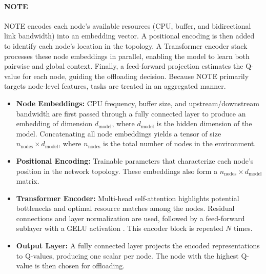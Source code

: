 \documentclass[preprint,12pt]{elsarticle}
\begin{document}
\paragraph{NOTE}
\label{par:nOTE}

NOTE encodes each node’s available resources (CPU, buffer, and bidirectional link bandwidth) into an embedding vector. A positional encoding is then added to identify each node’s location in the topology. A Transformer encoder stack processes these node embeddings in parallel, enabling the model to learn both pairwise and global context. Finally, a feed-forward projection estimates the Q-value for each node, guiding the offloading decision. Because NOTE primarily targets node-level features, tasks are treated in an aggregated manner.

\begin{itemize}
    \item \textbf{Node Embeddings:} CPU frequency, buffer size, and upstream/downstream bandwidth are first passed through a fully connected layer to produce an embedding of dimension \(\displaystyle d_{\text{model}}\), where \(d_{\text{model}}\) is the hidden dimension of the model. Concatenating all node embeddings yields a tensor of size \(\displaystyle n_{\text{nodes}} \times d_{\text{model}}\), where \(n_{\text{nodes}}\) is the total number of nodes in the environment.
    \item \textbf{Positional Encoding:} Trainable parameters that characterize each node’s position in the network topology. These embeddings also form a \(\displaystyle n_{\text{nodes}} \times d_{\text{model}}\) matrix.
    \item \textbf{Transformer Encoder:} Multi-head self-attention highlights potential bottlenecks and optimal resource matches among the nodes. Residual connections and layer normalization are used, followed by a feed-forward sublayer with a GELU activation \cite{hendrycks2023gaussianerrorlinearunits}. This encoder block is repeated \(N\) times.
    \item \textbf{Output Layer:} A fully connected layer projects the encoded representations to Q-values, producing one scalar per node. The node with the highest Q-value is then chosen for offloading.
\end{itemize}
\end{document}
